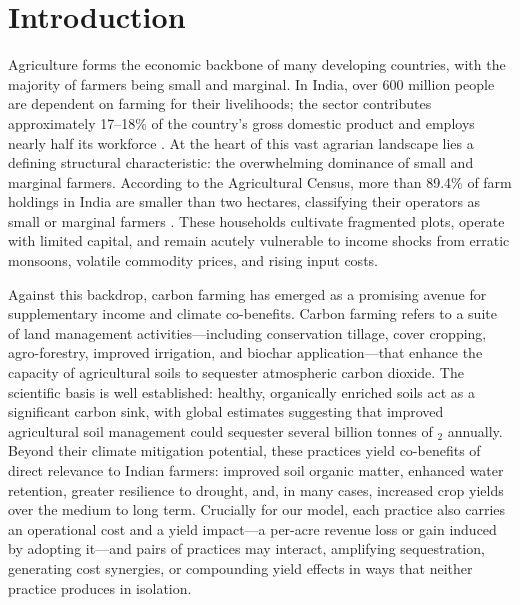 \documentclass[manuscript, screen, review, anonymous]{acmart}
\begin{document}
\section{Introduction}

Agriculture forms the economic backbone of many developing countries, with the majority of farmers being small and marginal. In India, over 600 million people are dependent on farming for their livelihoods; the sector contributes approximately 17--18\% of the country's gross domestic product and employs nearly half its workforce \cite{MOSPI2024}. At the heart of this vast agrarian landscape lies a defining structural characteristic: the overwhelming dominance of small and marginal farmers. According to the Agricultural Census, more than 89.4\% of farm holdings in India are smaller than two hectares, classifying their operators as small or marginal farmers \cite{MoAFW2023SmallFarmers}. These households cultivate fragmented plots, operate with limited capital, and remain acutely vulnerable to income shocks from erratic monsoons, volatile commodity prices, and rising input costs.

Against this backdrop, carbon farming has emerged as a promising avenue for supplementary income and climate co-benefits. Carbon farming refers to a suite of land management activities---including conservation tillage, cover cropping, agro-forestry, improved irrigation, and biochar application---that enhance the capacity of agricultural soils to sequester atmospheric carbon dioxide. The scientific basis is well established: healthy, organically enriched soils act as a significant carbon sink, with global estimates suggesting that improved agricultural soil management could sequester several billion tonnes of $_2$ annually. Beyond their climate mitigation potential, these practices yield co-benefits of direct relevance to Indian farmers: improved soil organic matter, enhanced water retention, greater resilience to drought, and, in many cases, increased crop yields over the medium to long term. Crucially for our model, each practice also carries an operational cost and a yield impact---a per-acre revenue loss or gain induced by adopting it---and pairs of practices may interact, amplifying sequestration, generating cost synergies, or compounding yield effects in ways that neither practice produces in isolation.
\end{document}
